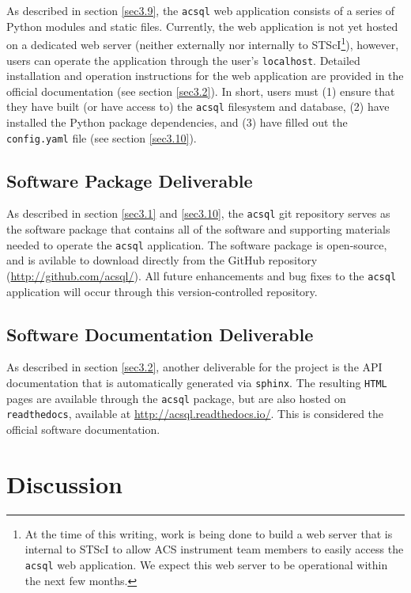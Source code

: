 \documentclass[10pt,journal,compsoc]{IEEEtran}
\begin{document}
As described in section \ref{sec3.9}, the \texttt{acsql} web application consists of a series of Python modules and static files.  Currently, the web application is not yet hosted on a
dedicated web server (neither externally nor internally to STScI\footnote{At the time of this writing, work is being done to build a web server that is internal to STScI to allow ACS instrument
team members to easily access the \texttt{acsql} web application.  We expect this web server to be operational within the next few months.}), however, users can operate the application through
the user's \texttt{localhost}.  Detailed installation and operation instructions for the web application are provided in the official documentation (see section \ref{sec3.2}).  In short,
users must (1) ensure that they have built (or have access to) the \texttt{acsql} filesystem and database, (2) have installed the Python package dependencies, and (3) have filled out the
\texttt{config.yaml} file (see section \ref{sec3.10}).


\subsection{Software Package Deliverable} \label{sec4.4}

As described in section \ref{sec3.1} and \ref{sec3.10}, the \texttt{acsql} git repository serves as the software package that contains all of the software and supporting materials needed to
operate the \texttt{acsql} application.  The software package is open-source, and is avilable to download directly from the GitHub repository (\textcolor{blue}{\url{http://github.com/acsql/}}).
All future enhancements and bug fixes to the \texttt{acsql} application will occur through this version-controlled repository.


\subsection{Software Documentation Deliverable} \label{sec4.5}

As described in section \ref{sec3.2}, another deliverable for the project is the API documentation that is automatically generated via \texttt{sphinx}.  The resulting \texttt{HTML} pages are
available through the \texttt{acsql} package, but are also hosted on \texttt{readthedocs}, available at \textcolor{blue}{\url{http://acsql.readthedocs.io/}}.  This is considered the official software
documentation.


\section{Discussion} \label{chap5}
\end{document}
